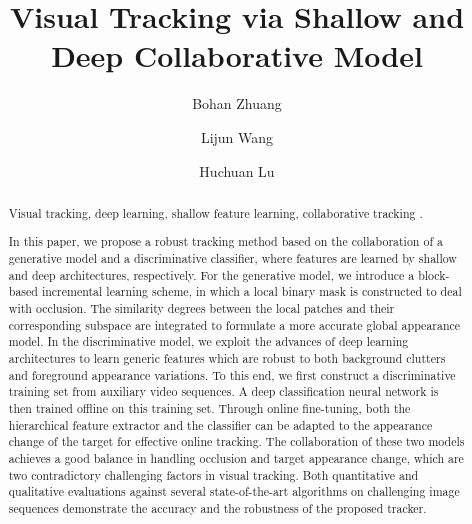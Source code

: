 \documentclass[preprint,12pt,review]{elsarticle}
\begin{document}
\begin{frontmatter}



\title{Visual Tracking via Shallow and Deep Collaborative Model}

\author{Bohan Zhuang}



\author{Lijun Wang}

\author{Huchuan Lu}
\address{School of Information and Communication Engineering,
	Dalian University of Technology, Dalian, 116023, China}


\begin{abstract}
	
\begin{keyword}
Visual tracking, deep learning, shallow feature learning, collaborative tracking . 
\end{keyword}

In this paper, we propose a robust tracking method based on the collaboration of a generative model and a discriminative classifier, where features are learned by shallow and deep architectures, respectively.
For the generative model, we introduce a block-based incremental learning scheme, in which a local binary mask is constructed to deal with occlusion.
The similarity degrees between the local patches and their corresponding subspace are integrated to formulate a more accurate global appearance model.
In the discriminative model, we exploit the advances of deep learning architectures to learn generic features which are robust to both background clutters and foreground appearance variations.
To this end, we first construct a discriminative training set from auxiliary video sequences.
A deep classification neural network is then trained offline on this training set.
Through online fine-tuning, both the hierarchical feature extractor and the classifier can be adapted to the appearance change of the target for effective online tracking.
The collaboration of these two models achieves a good balance in handling occlusion and target appearance change, which are two contradictory challenging factors in visual tracking.
Both quantitative and qualitative evaluations against several state-of-the-art algorithms on challenging image sequences demonstrate the accuracy and the robustness of the proposed tracker.
\end{abstract}

\end{frontmatter}
\end{document}
